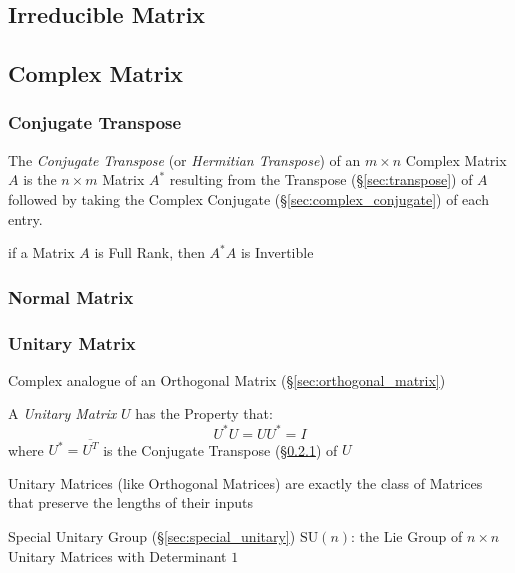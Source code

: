 \subsection{Irreducible Matrix}\label{sec:irreducible_matrix}

\subsection{Complex Matrix}\label{sec:complex_matrix}

\subsubsection{Conjugate Transpose}\label{sec:conjugate_transpose}

The \emph{Conjugate Transpose} (or \emph{Hermitian Transpose}) of an $m \times
n$ Complex Matrix $A$ is the $n \times m$ Matrix $A^*$ resulting from the
Transpose (\S\ref{sec:transpose}) of $A$ followed by taking the Complex
Conjugate (\S\ref{sec:complex_conjugate}) of each entry.

if a Matrix $A$ is Full Rank, then $A^*A$ is Invertible



\subsubsection{Normal Matrix}\label{sec:normal_matrix}

\subsubsection{Unitary Matrix}\label{sec:unitary_matrix}

Complex analogue of an Orthogonal Matrix (\S\ref{sec:orthogonal_matrix})

A \emph{Unitary Matrix} $U$ has the Property that:
\[
  U^*U = UU^* = I
\]
where $U^* = \overline{U^T}$ is the Conjugate Transpose
(\S\ref{sec:conjugate_transpose}) of $U$

Unitary Matrices (like Orthogonal Matrices) are exactly the class of Matrices
that preserve the lengths of their inputs

\fist Special Unitary Group (\S\ref{sec:special_unitary})
$\mathrm{SU}(n)$: the Lie Group of $n \times n$ Unitary Matrices with
Determinant $1$

